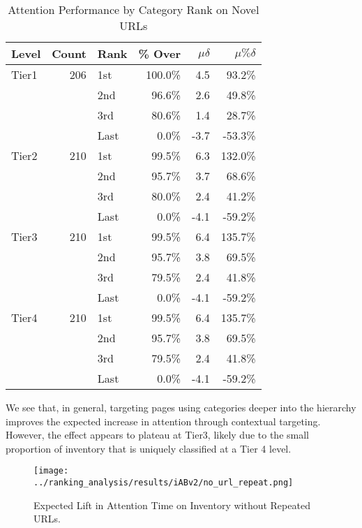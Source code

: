 \documentclass[sigconf]{acmart}
\begin{document}
\begin{table}
\caption{Attention Performance by Category Rank on Novel URLs}
\label{tab:nourlrepeats}
\begin{tabular}{|l|r|l|r|r|r|}
\toprule
Level   &Count    &Rank &\% Over  &$\mu\delta$  &$\mu\%\delta$        \\
\midrule
Tier1   &206      &1st  &100.0\%    &4.5         &93.2\%     \\
        &         &2nd  &96.6\%     &2.6         &49.8\%     \\
        &         &3rd  &80.6\%     &1.4         &28.7\%     \\
        &         &Last &0.0\%      &-3.7        &-53.3\%     \\
Tier2   &210      &1st  &99.5\%     &6.3         &132.0\%     \\
        &         &2nd  &95.7\%     &3.7         &68.6\%     \\
        &         &3rd  &80.0\%     &2.4         &41.2\%     \\
        &         &Last &0.0\%      &-4.1        &-59.2\%     \\
Tier3   &210      &1st  &99.5\%     &6.4         &135.7\%     \\
        &         &2nd  &95.7\%     &3.8         &69.5\%     \\
        &         &3rd  &79.5\%     &2.4         &41.8\%     \\
        &         &Last &0.0\%      &-4.1        &-59.2\%     \\
Tier4   &210      &1st  &99.5\%     &6.4         &135.7\%     \\
        &         &2nd  &95.7\%     &3.8         &69.5\%     \\
        &         &3rd  &79.5\%     &2.4         &41.8\%     \\
        &         &Last &0.0\%      &-4.1        &-59.2\%     \\
\bottomrule
\end{tabular}
\end{table}

We see that, in general, targeting pages using categories deeper into the hierarchy
improves the expected increase in attention through contextual targeting.
However, the effect appears to plateau at Tier3, likely due to the small proportion of inventory
that is uniquely classified at a Tier 4 level.

\begin{figure*}
\texttt{[image: ../ranking\_analysis/results/iABv2/no\_url\_repeat.png]}
\caption{Expected Lift in Attention Time on Inventory without Repeated URLs.}
\label{fig:no_url}
\end{figure*}
\end{document}
